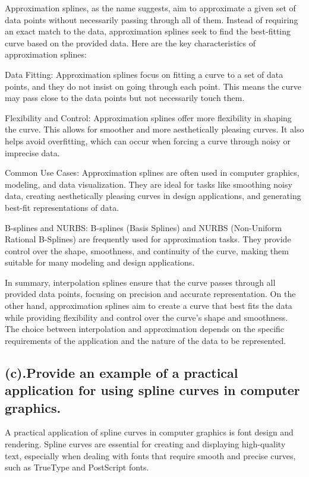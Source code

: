 \documentclass{article}
\begin{document}
\begin{itemize}
Approximation splines, as the name suggests, aim to approximate a given set of data points without necessarily passing through all of them. Instead of requiring an exact match to the data, approximation splines seek to find the best-fitting curve based on the provided data. Here are the key characteristics of approximation splines:

Data Fitting: Approximation splines focus on fitting a curve to a set of data points, and they do not insist on going through each point. This means the curve may pass close to the data points but not necessarily touch them.

Flexibility and Control: Approximation splines offer more flexibility in shaping the curve. This allows for smoother and more aesthetically pleasing curves. It also helps avoid overfitting, which can occur when forcing a curve through noisy or imprecise data.

Common Use Cases: Approximation splines are often used in computer graphics, modeling, and data visualization. They are ideal for tasks like smoothing noisy data, creating aesthetically pleasing curves in design applications, and generating best-fit representations of data.

B-splines and NURBS: B-splines (Basis Splines) and NURBS (Non-Uniform Rational B-Splines) are frequently used for approximation tasks. They provide control over the shape, smoothness, and continuity of the curve, making them suitable for many modeling and design applications.

In summary, interpolation splines ensure that the curve passes through all provided data points, focusing on precision and accurate representation. On the other hand, approximation splines aim to create a curve that best fits the data while providing flexibility and control over the curve's shape and smoothness. The choice between interpolation and approximation depends on the specific requirements of the application and the nature of the data to be represented.
\subsection{(c).Provide an example of a practical application for using spline curves in computer graphics.}
A practical application of spline curves in computer graphics is font design and rendering. Spline curves are essential for creating and displaying high-quality text, especially when dealing with fonts that require smooth and precise curves, such as TrueType and PostScript fonts.


\end{itemize}
\end{document}
